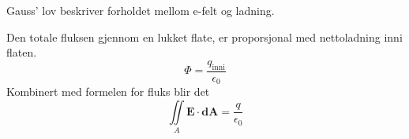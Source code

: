 Gauss' lov beskriver forholdet mellom e-felt og ladning.

Den totale fluksen gjennom en lukket flate,
er proporsjonal med nettoladning inni flaten.
$$\Phi = \frac{q_\text{inni}}{\epsilon_0}$$
Kombinert med formelen for fluks blir det
$$\iint\limits_A \mathbf{E}\cdot\mathbf{dA} = \frac{q}{\epsilon_0}$$
